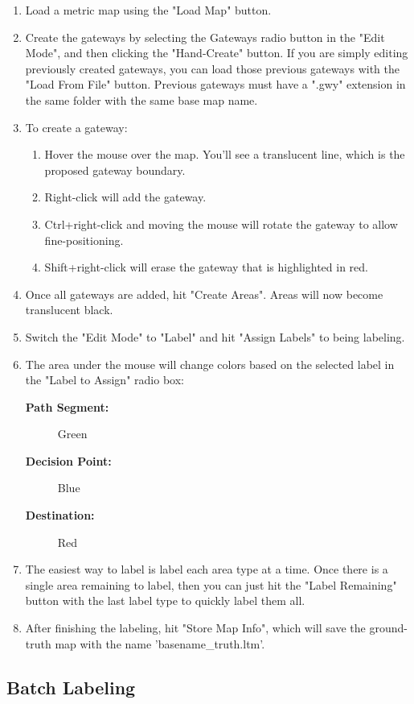 \documentclass{article}
\begin{document}
\begin{enumerate}
  \item Load a metric map using the "Load Map" button.
  \item Create the gateways by selecting the Gateways radio button in the "Edit Mode", and then clicking the
    "Hand-Create" button. If you are simply editing previously created gateways, you can load those previous gateways
    with the "Load From File" button. Previous gateways must have a ".gwy" extension in the same folder with the same
    base map name.
  \item To create a gateway:
    \begin{enumerate}
      \item Hover the mouse over the map. You'll see a translucent line, which is the proposed gateway boundary.
      \item Right-click will add the gateway.
      \item Ctrl+right-click and moving the mouse will rotate the gateway to allow fine-positioning.
      \item Shift+right-click will erase the gateway that is highlighted in red.
    \end{enumerate}
  \item Once all gateways are added, hit "Create Areas". Areas will now become translucent black.
  \item Switch the "Edit Mode" to "Label" and hit "Assign Labels" to being labeling.
  \item The area under the mouse will change colors based on the selected label in the "Label to Assign" radio box:
    \begin{description}
      \item[\textbf{Path Segment:}] Green
      \item[\textbf{Decision Point:}] Blue
      \item[\textbf{Destination:}] Red
    \end{description}
  \item The easiest way to label is label each area type at a time. Once there is a single area remaining to label,
    then you can just hit the "Label Remaining" button with the last label type to quickly label them all.
  \item After finishing the labeling, hit "Store Map Info", which will save the ground-truth map with the name
    'basename\_truth.ltm'.
\end{enumerate}

\subsection{Batch Labeling}
\end{document}
